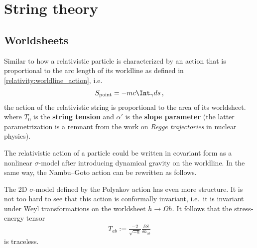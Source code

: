 \section{String theory}
\subsection{Worldsheets}

    Similar to how a relativistic particle is characterized by an action that is proportional to the arc length of its worldline as defined in \cref{relativity:worldline_action}, i.e.
    \begin{gather}
        S_{\text{point}}=-mc\Int_\gamma ds\,,
    \end{gather}
    the action of the relativistic string is proportional to the area of its worldsheet.
    where $T_0$ is the \textbf{string tension} and $\alpha'$ is the \textbf{slope parameter} (the latter parametrization is a remnant from the work on \textit{Regge trajectories} in nuclear physics).

    The relativistic action of a particle could be written in covariant form as a nonlinear $\sigma$-model after introducing dynamical gravity on the worldline. In the same way, the Nambu--Goto action can be rewritten as follows.

    \begin{property}
        The 2D $\sigma$-model defined by the Polyakov action has even more structure. It is not too hard to see that this action is conformally invariant, i.e.~it is invariant under Weyl transformations on the worldsheet $h\longrightarrow\Omega h$. It follows that the stress-energy tensor
        \begin{gather}
            T_{ab} := \frac{-2}{\sqrt{-h}}\frac{\delta S}{\delta h_{ab}}
        \end{gather}
        is traceless.
    \end{property}

